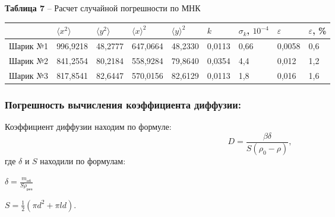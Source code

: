 \documentclass[12pt,a4paper]{article}
\begin{document}
            \begin{table}[!h]
            \begin{flushleft}
                \hspace{10}\textbf{Таблица 7} -- Расчет случайной погрешности по МНК \\
                \end{flushleft}
                    \begin{center}
                        \begin{tabular}{ | l | l | l | l | l | l | l | l | l |}
                        \hline
                        &   $\langle x^2 \rangle$ &   $\langle y^2 \rangle$  &   $\langle x \rangle ^2 $  &   $\langle y \rangle ^2$ &   $k$ &   $\sigma_k$, $10^{-4}$  &   $\varepsilon$ &  $\varepsilon$, \%   \\
                        \hline
                        Шарик №1    &   996,9218    & 48,2777   &   647,0664   &   48,2330  &   0,0113  &   0,66   &   0,0058  &   0,6  \\
                        \hline
                        Шарик №2    &    841,2554   & 80,2184   &  558,9284    &   79,8640  &   0,0354  &   4,4    &   0,012   &   1,2  \\
                        \hline
                        Шарик №3    &    817,8541   & 82,6447   &   570,0156   &   82,6129  &   0,0113  &   1,8    &   0,016   &   1,6 \\
                        \hline
                        \end{tabular}
                    \end{center}
                \end{table}    
    \newpage            
        \subsubsection{Погрешность вычисления коэффициента диффузии:}
            Коэффициент диффузии находим по формуле:
            \[
            D = \frac{\beta \delta}{S(\rho_0 - \rho)},
            \]
            где $\delta$ и $S$ находили по формулам:
            \begin{center}

            
            $\delta = \frac{m_\text{об}}{S \rho_\text{рез}}$    
            
            $S = \frac{1}{2}(\pi d^2 + \pi l d)$.    
            \end{center}
\end{document}
